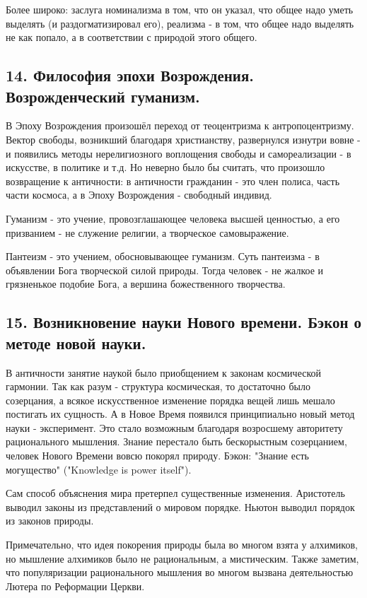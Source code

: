 \documentclass[a4paper, 12pt]{article}
\begin{document}
Более широко: заслуга номинализма в том, что он указал, что общее надо уметь выделять (и раздогматизировал его), реализма - в том, что общее надо выделять не как попало, а в соответствии с природой этого общего.


\subsection*{\textbf{14. Философия эпохи Возрождения. Возрожденческий гуманизм.}}

В Эпоху Возрождения произошёл переход от теоцентризма к антропоцентризму.
Вектор свободы, возникший благодаря христианству, развернулся изнутри вовне - и появились методы нерелигиозного воплощения свободы и самореализации - в искусстве, в политике и т.д.
Но неверно было бы считать, что произошло возвращение к античности: в античности гражданин - это член полиса, часть части космоса, а в Эпоху Возрождения - свободный индивид.

Гуманизм - это учение, провозглашающее человека высшей ценностью, а его призванием - не служение религии, а творческое самовыражение.

Пантеизм - это учением, обосновывающее гуманизм.
Суть пантеизма - в объявлении Бога творческой силой природы.
Тогда человек - не жалкое и грязненькое подобие Бога, а вершина божественного творчества.


\subsection*{\textbf{15. Возникновение науки Нового времени. Бэкон о методе новой науки.}}

В античности занятие наукой было приобщением к законам космической гармонии.
Так как разум - структура космическая, то достаточно было созерцания, а всякое искусственное изменение порядка вещей лишь мешало постигать их сущность.
А в Новое Время появился принципиально новый метод науки - эксперимент.
Это стало возможным благодаря возросшему авторитету рационального мышления.
Знание перестало быть бескорыстным созерцанием, человек Нового Времени вовсю покорял природу.
Бэкон: "Знание есть могущество" ("Knowledge is power itself").

Сам способ объяснения мира претерпел существенные изменения.
Аристотель выводил законы из представлений о мировом порядке.
Ньютон выводил порядок из законов природы.

Примечательно, что идея покорения природы была во многом взята у алхимиков, но мышление алхимиков было не рациональным, а мистическим.
Также заметим, что популяризации рационального мышления во многом вызвана деятельностью Лютера по Реформации Церкви.
\end{document}
